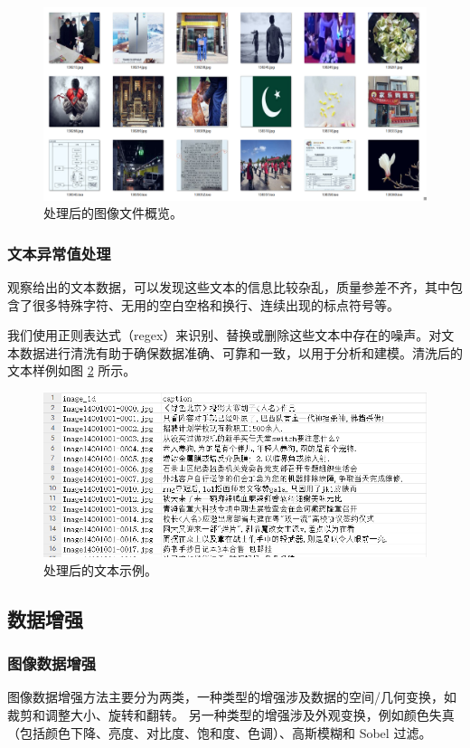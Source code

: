 \documentclass[a4paper]{zreport}
\begin{document}
\begin{figure}[h]
\centering
\includegraphics[width=0.95\linewidth]{figures/clean_image}
\caption{处理后的图像文件概览。}
\label{fig:cleanimage}
\end{figure}

\subsubsection{文本异常值处理}

观察给出的文本数据，可以发现这些文本的信息比较杂乱，质量参差不齐，其中包含了很多特殊字符、无用的空白空格和换行、连续出现的标点符号等。

我们使用正则表达式（regex）来识别、替换或删除这些文本中存在的噪声。对文本数据进行清洗有助于确保数据准确、可靠和一致，以用于分析和建模。清洗后的文本样例如图 \ref{fig:cleantext} 所示。

\begin{figure}[h]
\centering
\includegraphics[width=0.95\linewidth]{figures/clean_text}
\caption{处理后的文本示例。}
\label{fig:cleantext}
\end{figure}


\subsection{数据增强}


\subsubsection{图像数据增强}
图像数据增强方法主要分为两类，一种类型的增强涉及数据的空间/几何变换，如裁剪和调整大小、旋转和翻转。 另一种类型的增强涉及外观变换，例如颜色失真（包括颜色下降、亮度、对比度、饱和度、色调）、高斯模糊和 Sobel 过滤。
\end{document}
